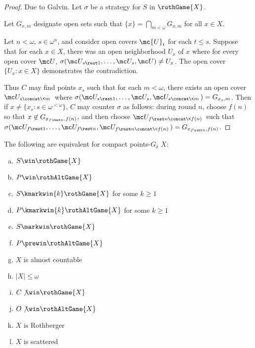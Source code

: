   \begin{proof}

    Due to Galvin. Let $\sigma$ be a strategy for $S$ in $\rothGame{X}$.

    Let $G_{x,m}$ designate open sets such that $\{x\}=\bigcap_{m<\omega}G_{x,m}$ for all $x\in X$.

    Let $n<\omega$, $s\in\omega^{n}$, and consider open covers $\mc{U}_t$ for each $t\leq s$. Suppose that for each $x\in X$, there was an open neighborhood $U_x$ of $x$ where for every open cover $\mc U$, $\sigma(\mc U_{s\rest 1},\dots,\mc U_{s},\mc U)\not=U_x$. The open cover $\{U_x : x\in X\}$ demonstrates the contradiction.

    Thus $C$ may find points $x_s$ such that for each $m<\omega$, there exists an open cover $\mc U_{s\concat\<m\>}$ where $\sigma(\mc U_{s\rest 1},\dots,\mc U_{s},\mc U_{s\concat\<m\>})=G_{x_s,m}$. Then if $x\not=\{x_s : s\in\omega^{<\omega}\}$, $C$ may counter $\sigma$ as follows: during round $n$, choose $f(n)$ so that $x\not\in G_{x_{f\rest n},f(n)}$, and then choose $\mc U_{f\rest n\concat\<f(n)\>}$ such that $\sigma(\mc U_{f\rest 1},\dots,\mc U_{f\rest n},\mc U_{f\rest n\concat\<f(n)\>})=G_{x_{f\rest n},f(n)}$.
  \end{proof}

  \begin{cor}
    The following are equivalent for compact points-$G_\delta$ $X$:
      \begin{enumerate}[(a)]
        \item $S\win\rothGame{X}$
        \item $P\win\rothAltGame{X}$
        \item $S\kmarkwin{k}\rothGame{X}$ for some $k\geq 1$
        \item $P\kmarkwin{k}\rothAltGame{X}$ for some $k\geq 1$
        \item $S\markwin\rothGame{X}$
        \item $P\prewin\rothAltGame{X}$
        \item $X$ is almost countable
        \item $|X|\leq\omega$
        \item $C\not\win\rothGame{X}$
        \item $O\not\win\rothAltGame{X}$
        \item $X$ is Rothberger
        \item $X$ is scattered
      \end{enumerate}
  \end{cor}

